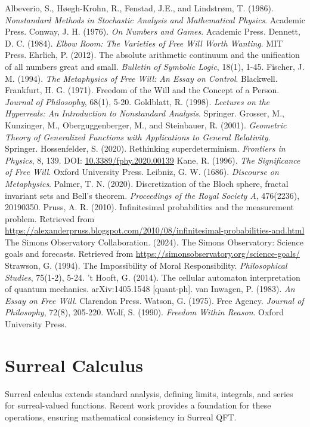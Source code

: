\documentclass{article}
\begin{document}
\begin{thebibliography}{9}
 Albeverio, S., Høegh-Krohn, R., Fenstad, J.E., and Lindstrøm, T. (1986). \emph{Nonstandard Methods in Stochastic Analysis and Mathematical Physics}. Academic Press.
 Conway, J. H. (1976). \emph{On Numbers and Games}. Academic Press.
 Dennett, D. C. (1984). \emph{Elbow Room: The Varieties of Free Will Worth Wanting}. MIT Press.
 Ehrlich, P. (2012). The absolute arithmetic continuum and the unification of all numbers great and small. \emph{Bulletin of Symbolic Logic}, 18(1), 1-45.
 Fischer, J. M. (1994). \emph{The Metaphysics of Free Will: An Essay on Control}. Blackwell.
 Frankfurt, H. G. (1971). Freedom of the Will and the Concept of a Person. \emph{Journal of Philosophy}, 68(1), 5-20.
 Goldblatt, R. (1998). \emph{Lectures on the Hyperreals: An Introduction to Nonstandard Analysis}. Springer.
 Grosser, M., Kunzinger, M., Oberguggenberger, M., and Steinbauer, R. (2001). \emph{Geometric Theory of Generalized Functions with Applications to General Relativity}. Springer.
 Hossenfelder, S. (2020). Rethinking superdeterminism. \emph{Frontiers in Physics}, 8, 139. DOI: \href{https://doi.org/10.3389/fphy.2020.00139}{10.3389/fphy.2020.00139}
 Kane, R. (1996). \emph{The Significance of Free Will}. Oxford University Press.
 Leibniz, G. W. (1686). \emph{Discourse on Metaphysics}.
 Palmer, T. N. (2020). Discretization of the Bloch sphere, fractal invariant sets and Bell's theorem. \emph{Proceedings of the Royal Society A}, 476(2236), 20190350.
 Pruss, A. R. (2010). Infinitesimal probabilities and the measurement problem. Retrieved from \url{https://alexanderpruss.blogspot.com/2010/08/infinitesimal-probabilities-and.html}
 The Simons Observatory Collaboration. (2024). The Simons Observatory: Science goals and forecasts. Retrieved from \url{https://simonsobservatory.org/science-goals/}
 Strawson, G. (1994). The Impossibility of Moral Responsibility. \emph{Philosophical Studies}, 75(1-2), 5-24.
 't Hooft, G. (2014). The cellular automaton interpretation of quantum mechanics. arXiv:1405.1548 [quant-ph].
 van Inwagen, P. (1983). \emph{An Essay on Free Will}. Clarendon Press.
 Watson, G. (1975). Free Agency. \emph{Journal of Philosophy}, 72(8), 205-220.
 Wolf, S. (1990). \emph{Freedom Within Reason}. Oxford University Press.
\end{thebibliography}

\appendix
\section{Surreal Calculus}
Surreal calculus extends standard analysis, defining limits, integrals, and series for surreal-valued functions. Recent work \cite{Ehrlich2012} provides a foundation for these operations, ensuring mathematical consistency in Surreal QFT.
\end{document}
